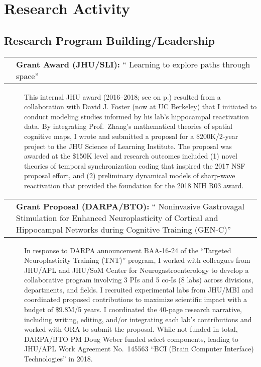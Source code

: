 \documentclass[10pt]{article}
\makeatletter
\newcommand{\unpubtitle}[1]{{\color{hopkinsblue} #1}}
\newcommand{\researchnote}[1]{
  \begin{description}
    \item[] {\hspace{2.2ex}\color{darkgray} #1}
  \end{description}
}
\newcommand{\researchactivity}[4]{
  \begin{minipage}[t]{\textwidth}
    \begin{tabular}{@{\hspace{2ex}}l>{\raggedright\arraybackslash}p{.8\textwidth}}
      \makebox[1.2in][l]{#1} & \textbf{#2:}
      ``\unpubtitle{#3}'' 
    \end{tabular}
  \researchnote{\hspace{1ex} #4}
  \end{minipage}
  \medbreak
}
\makeatother
\begin{document}
\section*{Research Activity}

\subsection*{Research Program Building/Leadership}
\label{sec:resprogram}

\researchactivity
{Mar. 2016--2018}
{Grant Award (JHU/SLI)}
{Learning to explore paths through space}
{This internal JHU award (2016--2018; see
  \emph{\nameref{sec:previnternalsupport}} on p.\pageref{sec:previnternalsupport})
  resulted from a collaboration with David J. Foster (now at UC Berkeley) that
  I initiated to conduct modeling studies informed by his lab’s hippocampal
  reactivation data. By integrating Prof.~Zhang’s mathematical theories of
  spatial cognitive maps, I wrote and submitted a proposal for a \$200K/2-year
  project to the JHU Science of Learning Institute. The proposal was awarded at
  the \$150K level and research outcomes included (1) novel theories of temporal
  synchronization coding that inspired the 2017 NSF proposal effort, and (2)
  preliminary dynamical models of sharp-wave reactivation that provided the
foundation for the 2018 NIH R03 award.}
\label{sec:ressli}

\researchactivity
{April--June 2016}
{Grant Proposal (DARPA/BTO)}
{Noninvasive Gastrovagal Stimulation for Enhanced Neuroplasticity of Cortical
and Hippocampal Networks during Cognitive Training (GEN-C)}
{In response to DARPA announcement BAA-16-24 of the “Targeted Neuroplasticity
  Training (TNT)” program, I worked with colleagues from JHU/APL and JHU/SoM
  Center for Neurogastroenterology to develop a collaborative program involving 3
  PIs and 5 co-Is (8 labs) across divisions, departments, and fields. I recruited
  experimental labs from JHU/MBI and coordinated proposed contributions to
  maximize scientific impact with a budget of \$9.8M/5 years. I coordinated the
  40-page research narrative, including writing, editing, and/or integrating
  each lab’s contributions and worked with ORA to submit the proposal. While
  not funded in total, DARPA/BTO PM Doug Weber funded select components, leading
  to JHU/APL Work Agreement No.~145563 “BCI (Brain Computer Interface)
Technologies” in 2018.}
\end{document}
